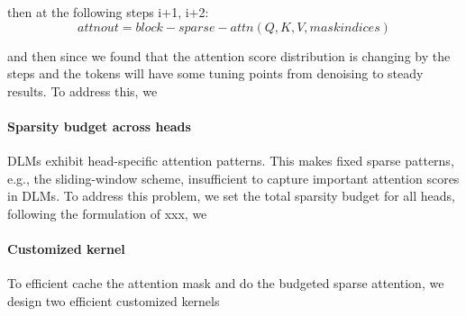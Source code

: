 then at the following steps i+1, i+2:
\[
attn out = block-sparse-attn(Q,K,V, maskindices)
\]

and then since we found that the attention score distribution is changing by the steps and the tokens will have some tuning points from denoising to steady results. To address this, we 

\paragraph{Sparsity budget across heads} DLMs exhibit head-specific attention patterns.
This makes fixed sparse patterns, e.g., the sliding-window scheme, insufficient to capture important attention scores in DLMs. To address this problem, we set the total sparsity budget for all heads, following the formulation of xxx, we 

\paragraph{Customized kernel}

To efficient cache the attention mask and do the budgeted sparse attention, we design two efficient customized kernels